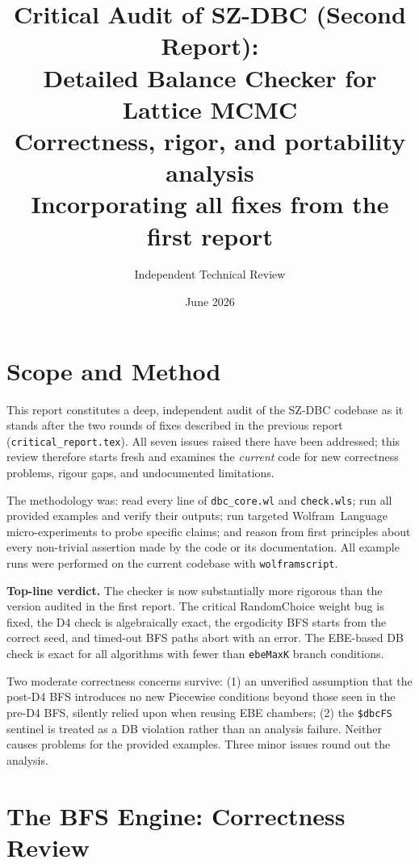 \documentclass[12pt,a4paper]{article}
\title{\textbf{Critical Audit of SZ-DBC (Second Report):\\Detailed Balance Checker for Lattice MCMC}\\[1ex]
\large Correctness, rigor, and portability analysis\\
\normalsize Incorporating all fixes from the first report}
\author{Independent Technical Review}
\date{June 2026}
\theoremstyle{critical}
\theoremstyle{remark}
\theoremstyle{verified}
\begin{document}
\maketitle
\tableofcontents
\newpage

\section{Scope and Method}

This report constitutes a deep, independent audit of the SZ-DBC codebase as it
stands after the two rounds of fixes described in the previous report
(\texttt{critical\_report.tex}).  All seven issues raised there have been addressed;
this review therefore starts fresh and examines the \emph{current} code for
new correctness problems, rigour gaps, and undocumented limitations.

The methodology was: read every line of \texttt{dbc\_core.wl} and
\texttt{check.wls}; run all provided examples and verify their outputs; run
targeted Wolfram~Language micro-experiments to probe specific claims; and
reason from first principles about every non-trivial assertion made by the
code or its documentation.  All example runs were performed on the current
codebase with \texttt{wolframscript}.

\begin{mdframed}[backgroundcolor=green!8,linecolor=green!60!black,linewidth=1pt]
\textbf{Top-line verdict.}
The checker is now substantially more rigorous than the version audited in the
first report.  The critical RandomChoice weight bug is fixed, the D4 check is
algebraically exact, the ergodicity BFS starts from the correct seed, and
timed-out BFS paths abort with an error.  The EBE-based DB check is exact for
all algorithms with fewer than \texttt{ebeMaxK} branch conditions.

Two moderate correctness concerns survive: (1) an unverified assumption that
the post-D4 BFS introduces no new Piecewise conditions beyond those seen in the
pre-D4 BFS, silently relied upon when reusing EBE chambers; (2) the
\texttt{\$dbcFS} sentinel is treated as a DB violation rather than an analysis
failure.  Neither causes problems for the provided examples.  Three minor issues
round out the analysis.
\end{mdframed}

\section{The BFS Engine: Correctness Review}
\label{sec:bfs}
\end{document}
